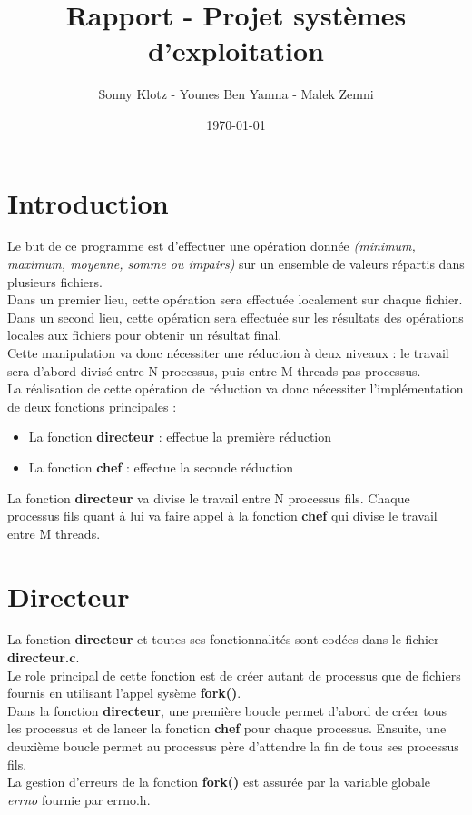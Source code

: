 \documentclass[a4]{article}
\author{Sonny Klotz - Younes Ben Yamna - Malek Zemni}
\title{Rapport - Projet systèmes d'exploitation}
\date{\today}
\begin{document}
\maketitle

	\section{Introduction}
			Le but de ce programme est d'effectuer une opération donnée \textit{(minimum, maximum, moyenne, somme ou impairs)} sur
			un ensemble de valeurs répartis dans plusieurs fichiers.\\
			Dans un premier lieu, cette opération sera effectuée localement sur chaque fichier. Dans un second lieu, cette opération sera effectuée
			sur les résultats des opérations locales aux fichiers pour obtenir un résultat final.\\
			Cette manipulation va donc nécessiter une réduction à deux niveaux : le travail sera d'abord divisé entre N processus, puis entre M 
			threads pas processus.\\
			La réalisation de cette opération de réduction va donc nécessiter l'implémentation de deux fonctions principales :
			\begin{itemize}
				\item{La fonction \textbf{directeur} : effectue la première réduction}
				\item{La fonction \textbf{chef} : effectue la seconde réduction}
			\end{itemize}
			La fonction \textbf{directeur} va divise le travail entre N processus fils. Chaque processus fils quant à lui va faire appel à la fonction 
			\textbf{chef} qui divise le travail entre M threads.
			
	\section{Directeur}
			La fonction \textbf{directeur} et toutes ses fonctionnalités sont codées dans le fichier \textbf{directeur.c}.\\
			Le role principal de cette fonction est de créer autant de processus que de fichiers fournis en utilisant l'appel sysème 
			\textbf{fork()}.\\
			Dans la fonction \textbf{directeur}, une première boucle permet d'abord de créer tous les processus et de lancer la fonction 
			\textbf{chef} pour chaque processus. Ensuite, une deuxième boucle permet au processus père d'attendre la fin de tous ses processus fils.\\
			La gestion d'erreurs de la fonction \textbf{fork()} est assurée par la variable globale \textit{errno} fournie par errno.h.\\
			
\end{document}
